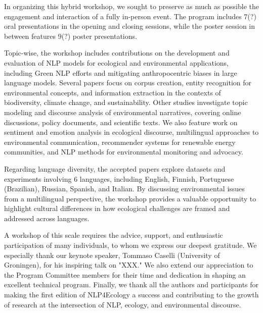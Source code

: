 In organizing this hybrid workshop, we sought to preserve as much as possible the engagement and interaction of a fully in-person event. The program includes 7(?) oral presentations in the opening and closing sessions, while the poster session in between features 9(?) poster presentations.

Topic-wise, the workshop includes contributions on the development and evaluation of NLP models for ecological and environmental applications, including Green NLP efforts and mitigating anthropocentric biases in large language models. Several papers focus on corpus creation, entity recognition for environmental concepts, and information extraction in the contexts of biodiversity, climate change, and sustainability. Other studies investigate topic modeling and discourse analysis of environmental narratives, covering online discussions, policy documents, and scientific texts. We also feature work on sentiment and emotion analysis in ecological discourse, multilingual approaches to environmental communication, recommender systems for renewable energy communities, and NLP methods for environmental monitoring and advocacy.

Regarding language diversity, the accepted papers explore datasets and experiments involving 6 languages, including English, Finnish, Portuguese (Brazilian), Russian, Spanish, and Italian. By discussing environmental issues from a multilingual perspective, the workshop provides a valuable opportunity to highlight cultural differences in how ecological challenges are framed and addressed across languages.

A workshop of this scale requires the advice, support, and enthusiastic participation of many individuals, to whom we express our deepest gratitude. We especially thank our keynote speaker, Tommaso Caselli (University of Groningen), for his inspiring talk on "XXX." We also extend our appreciation to the Program Committee members for their time and dedication in shaping an excellent technical program. Finally, we thank all the authors and participants for making the first edition of NLP4Ecology a success and contributing to the growth of research at the intersection of NLP, ecology, and environmental discourse.
